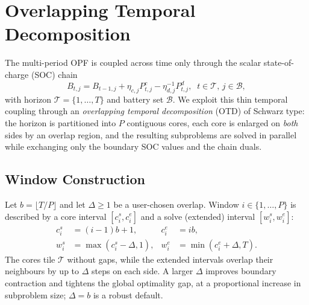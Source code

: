 
\section{Overlapping Temporal Decomposition}
\label{sec:otd}

The multi-period OPF is coupled across time only through the scalar
state-of-charge (SOC) chain
\begin{equation}
\label{eq:soc_chain}
B_{t,j} = B_{t-1,j} + \eta_{c,j}P^{c}_{t,j} - \eta_{d,j}^{-1}P^{d}_{t,j},
\;\; t\!\in\!\mathcal{T},\, j\!\in\!\mathcal{B},
\end{equation}
with horizon $\mathcal{T}\!=\!\{1,\dots,T\}$ and battery set $\mathcal{B}$.
We exploit this thin temporal coupling through an \emph{overlapping
temporal decomposition} (OTD) of Schwarz type: the horizon is partitioned
into $P$ contiguous cores, each core is enlarged on \emph{both} sides by
an overlap region, and the resulting subproblems are solved in parallel
while exchanging only the boundary SOC values and the chain duals.

\subsection{Window Construction}
\label{sec:otd_windows}

Let $b\!=\!\lfloor T/P\rfloor$ and let $\Delta\!\ge\!1$ be a user-chosen
overlap. Window $i\!\in\!\{1,\dots,P\}$ is described by a core interval
$[c^{s}_{i},c^{e}_{i}]$ and a solve (extended) interval
$[w^{s}_{i},w^{e}_{i}]$:
\begin{equation}
\label{eq:windows}
\begin{aligned}
c^{s}_{i} &= (i\!-\!1)b\!+\!1, & c^{e}_{i} &= ib,\\
w^{s}_{i} &= \max(c^{s}_{i}\!-\!\Delta,1), & w^{e}_{i} &= \min(c^{e}_{i}\!+\!\Delta,T).
\end{aligned}
\end{equation}
The cores tile $\mathcal{T}$ without gaps, while the extended intervals
overlap their neighbours by up to $\Delta$ steps on each side. A larger
$\Delta$ improves boundary contraction and tightens the global optimality
gap, at a proportional increase in subproblem size; $\Delta\!=\!b$ is a
robust default.

